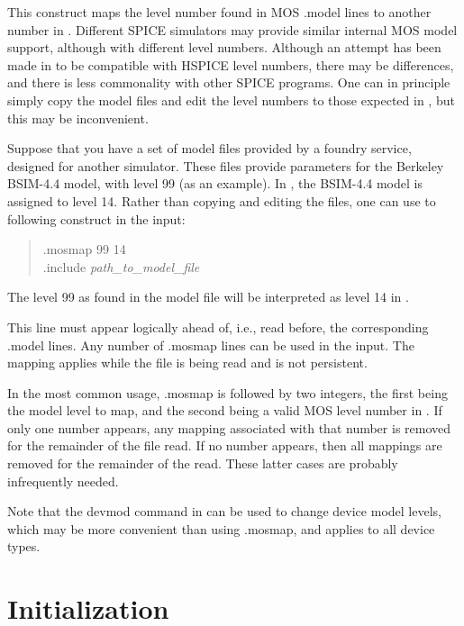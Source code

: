 This construct maps the level number found in MOS {\vt .model} lines
to another number in {\WRspice}.  Different SPICE simulators may
provide similar internal MOS model support, although with different
level numbers.  Although an attempt has been made in {\WRspice} to be
compatible with HSPICE level numbers, there may be differences, and
there is less commonality with other SPICE programs.  One can in
principle simply copy the model files and edit the level numbers to
those expected in {\WRspice}, but this may be inconvenient.

Suppose that you have a set of model files provided by a foundry
service, designed for another simulator.  These files provide
parameters for the Berkeley BSIM-4.4 model, with level 99 (as an
example).  In {\WRspice}, the BSIM-4.4 model is assigned to level 14. 
Rather than copying and editing the files, one can use to following
construct in the {\WRspice} input:

\begin{quote}
{\vt .mosmap 99 14}\\
{\vt .include} {\it path\_to\_model\_file}
\end{quote}

The level 99 as found in the model file will be interpreted as 
level 14 in {\WRspice}.

This line must appear logically ahead of, i.e., read before, the
corresponding {\vt .model} lines.  Any number of {\vt .mosmap} lines
can be used in the input.  The mapping applies while the file is being
read and is not persistent.

In the most common usage, {\vt .mosmap} is followed by two integers,
the first being the model level to map, and the second being a valid
MOS level number in {\WRspice}.  If only one number appears, any
mapping associated with that number is removed for the remainder of
the file read.  If no number appears, then all mappings are removed
for the remainder of the read.  These latter cases are probably
infrequently needed.

Note that the {\cb devmod} command in {\WRspice} can be used to change
device model levels, which may be more convenient than using {\vt
.mosmap}, and applies to all device types.


\section{Initialization}


